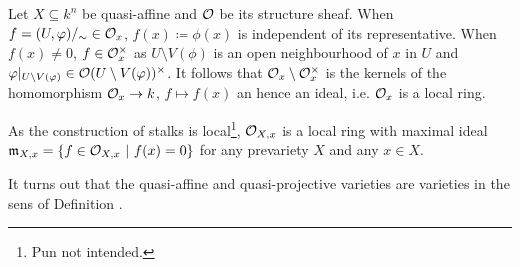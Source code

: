 \documentclass[a4paper,parskip=half,numbers=enddot, DIV=12]{scrreprt}
\begin{document}
\begin{rem}
    Let $X\subseteq k^n$ be quasi-affine and $\mathcal{O}$ be its structure sheaf. When $f=(U,\varphi)/_\sim\in \mathcal{O}_x$, $f(x)\coloneqq \phi(x)$ is independent of its representative. When $f(x)\neq 0$, $f\in \mathcal{O}_x^\times$ as $U\setminus V(\phi)$ is an open neighbourhood of $x$ in $U$ and $\varphi|_{U\setminus V(\varphi)} \in \mathcal{O}(U\setminus V(\varphi))^\times$. It follows that $\mathcal{O}_x\setminus\mathcal{O}_x^\times$ is the kernels of the homomorphism $\Oo_x \morphism k$, $f\mapsto f(x)$ an hence an ideal, i.e. $\mathcal{O}_x$ is a local ring. 
    
    As the construction of stalks is local\footnote{Pun not intended.}, $\mathcal{O}_{X,x}$ is a local ring with maximal ideal $\mathfrak{m}_{X,x} = \left\{f\in \mathcal{O}_{X,x}\ \middle|\  f(x) = 0\right\}$ for any prevariety $X$ and any $x\in X$. 
\end{rem}
\begin{rem}
    It turns out that the quasi-affine and quasi-projective varieties are varieties in the sens of Definition .
\end{rem}
\printbibliography
\end{document}
